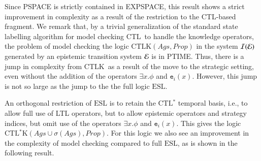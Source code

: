 \documentclass[a4wide]{article}
\newcommand{\CTLK}{\mbox{CTLK}}
\newcommand{\CTL}{\mbox{CTL}}
\newcommand{\CTLsK}{\mbox{CTL$^*$K}}
\newcommand{\CTLs}{\mbox{CTL$^*$}}
\newcommand{\ESL}{\mbox{ESL}}
\newcommand{\Prop}{Prop}
\newcommand{\ets}{{\cal E}}
\theoremstyle{examplesty}
\newcommand{\strat}{\sigma}
\newcommand{\Ags}{\mathit{Ags}}
\newcommand{\I}{\mathcal{I}}
\newcommand{\existsg}[1]{\exists #1.}
\newcommand{\lid}[2]{\mathtt{e}_{#1}(#2)}
\begin{document}
Since PSPACE is strictly contained in EXPSPACE, this result shows a strict improvement in 
complexity as  a result of the restriction to the CTL-based fragment. 
We remark that, by a trivial generalization of the standard state labelling algorithm for model 
checking \CTL\ to handle the knowledge operators, 
the problem of model checking the logic $\CTLK(\Ags, \Prop)$ 
in the system 
$\I(\ets)$ 
generated by an epistemic 
transition system 
$\ets$ is in PTIME. Thus, there is a jump in complexity from \CTLK\  
as a result of the move to the strategic setting, even without the addition of the operators $\existsg{x} \phi$ and $\lid{i}{x}$.  
However, this jump is not so large as the jump to the  the full logic $\ESL$. 

An orthogonal restriction of $\ESL$ is to retain the $\CTLs$ temporal basis, i.e., to allow full use of 
LTL operators, but to 
allow
epistemic operators and 
strategy 
indices, 
but omit use of the operators $\existsg{x} \phi$ and $\lid{i}{x}$. This gives the logic 
$\CTLsK(
\Ags 
\cup \strat(\Ags), \Prop)$. For this logic we also see an improvement in the complexity of model 
checking compared to full $\ESL$, as is shown in the following result. 
\end{document}

